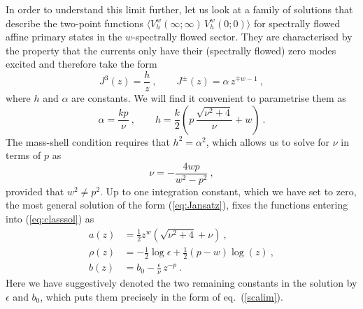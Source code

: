 \documentclass[12pt,a4paper]{article}
\newcommand{\be}{\begin{equation}}
\newcommand{\ee}{\end{equation}}
\begin{document}
In order to understand this limit further, let us look at a family of solutions that describe the two-point functions $\langle V_h^w(\infty;\infty) \, V_h^w(0;0) \rangle$ for spectrally flowed affine primary states in the $w$-spectrally flowed sector. They are characterised by the property that the currents only have their (spectrally flowed) zero modes excited and therefore take the form 
\be\label{eq:Jansatz}
J^3(z) = \frac{h}{z}\ , \qquad J^\pm (z) = \alpha \, z^{\mp w-1}\ ,
\ee
where $h$ and $\alpha$ are constants. We will find it convenient to parametrise them as 
\be
\alpha=\frac{kp}{\nu}\ , \qquad h =\frac{k}{2}\left(p\, \frac{\sqrt{\nu^2+4}}{\nu}+ w\right)\ .
\ee
The mass-shell condition requires that $h^2=\alpha^2$, which allows us to solve for $\nu$ in terms of $p$ as 
\be
\nu = - \frac{4wp}{w^2-p^2} \ ,
\ee
provided that $w^2\neq p^2$. Up to one integration constant, which we have set to zero, the most general solution of the form (\ref{eq:Jansatz}), fixes the functions entering into (\ref{eq:classsol}) as 
\begin{subequations}\label{eq:abrho}
\begin{align}
a(z)&= \frac{1}{2} z^w \left(\sqrt{\nu^2+4}+\nu\right)\ , \\
\rho (z)&=  - \frac{1}{2} \log{\epsilon}+\frac{1}{2} (p-w) \log (z)\ , \\
b(z)&= b_0 -  \frac{\epsilon}{\nu}\, z^{-p}\ .
\end{align}
\end{subequations}
Here we have suggestively denoted the two remaining constants in the solution by $\epsilon$ and $b_0$, which puts them precisely in the form of eq.~(\ref{scalim}). 
 
\end{document}
